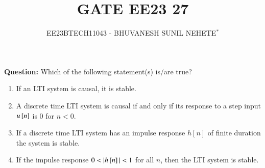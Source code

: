\documentclass[journal,12pt,twocolumn]{IEEEtran}
\theoremstyle{remark}
\begin{document}

\vspace{3cm}

\title{GATE EE23 27}
\author{EE23BTECH11043 - BHUVANESH SUNIL NEHETE$^{*}$%
}
\maketitle
\newpage
\bigskip

\renewcommand{\thefigure}{\theenumi}
\renewcommand{\thetable}{\theenumi}



\textbf{Question:}
Which of the following statement(s) is/are true?
\begin{enumerate}[label=\alph*)]
    \item If an LTI system is causal, it is stable.
    \item A discrete time LTI system is causal if and only if its response to a step input $u{}\left[n\right]$ is 0 for $n<0$.
    \item If a discrete time LTI system has an impulse response $h[n]$ of finite duration the system is stable.
    \item If the impulse response $0<|h\sbrak{n}|<1$ for all $n$, then the LTI system is stable.
\end{enumerate}
\solution
\end{document}
